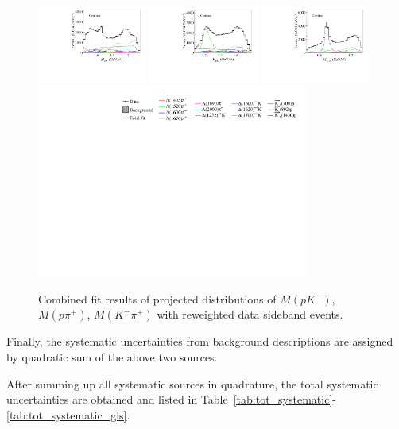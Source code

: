 \begin{figure}[htbp]\centering
    \includegraphics[width=0.32\textwidth]{figure/bkg_shape/data_all_m_R_BC.pdf}
    \includegraphics[width=0.32\textwidth]{figure/bkg_shape/data_all_m_R_BD.pdf}
    \includegraphics[width=0.32\textwidth]{figure/bkg_shape/data_all_m_R_CD.pdf} \\
    \includegraphics[width=0.80\textwidth]{figure/pwa_nominal/legend.pdf}

    \caption{Combined fit results of projected distributions of $M(pK^-)$, $M(p\pi^+)$, $M(K^-\pi^+)$ with reweighted data sideband events. }
\label{fig:pwa_bkgshape}
\end{figure}
Finally, the systematic uncertainties from background descriptions are assigned by quadratic sum of the above two sources.

After summing up all systematic sources in quadrature, the total systematic uncertainties are obtained and listed in Table~\ref{tab:tot_systematic}-\ref{tab:tot_systematic_gls}.

